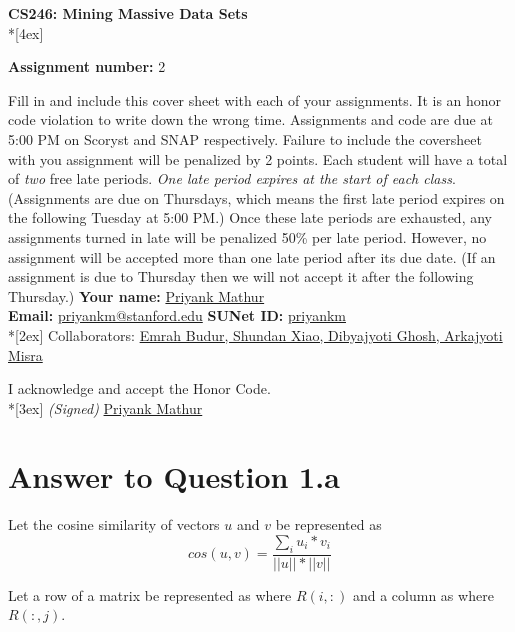 \documentclass[11pt]{article}
\begin{document}
\thispagestyle{empty}
\parindent 0pt
\vfill
\large

\begin{center}
\LARGE{\bf \textsf{CS246: Mining Massive Data Sets}} \\*[4ex]
\end{center}

{\Large
\textbf{Assignment number:} 2
\vfill
\vfill

Fill in and include this cover sheet with each of your assignments. It is an honor code
violation to write down the wrong time. Assignments and code are due at 5:00 PM on Scoryst and SNAP respectively. Failure to include the coversheet with you assignment will
be penalized by 2 points.
Each student will have a total of \textit{two} free late periods. \textit{One late period expires at the start of
each class}. (Assignments are due on Thursdays, which means the first late period expires on
the following Tuesday at 5:00 PM.) Once these late periods are exhausted, any assignments
turned in late will be penalized 50\% per late period. However, no assignment will be accepted
more than one late period after its due date. (If an assignment is due to Thursday then we
will not accept it after the following Thursday.)
\vfill
\vfill
{\Large
\textbf{Your name:} \underline{Priyank Mathur} \\
\textbf{Email:} \underline{priyankm@stanford.edu} \textbf{SUNet ID:} \underline{priyankm}\\*[2ex] }
Collaborators: \underline{Emrah Budur, Shundan Xiao, Dibyajyoti Ghosh, Arkajyoti Misra} \\
\vfill

\vfill

I acknowledge and accept the Honor Code.\\*[3ex]
\bigskip
\textit{(Signed)} \underline{Priyank Mathur}

\vfill
\vfill

\pagebreak[4]
\section*{Answer to Question 1.a}

Let the cosine similarity of vectors $u$ and $v$ be represented as 
$$ cos(u, v) = \frac{ \sum_{i} u_i * v_i }{||u|| * ||v||} $$

Let a row of a matrix be represented as where $R(i, :)$ and a column as where $R(:, j)$.\\

}
\end{document}

